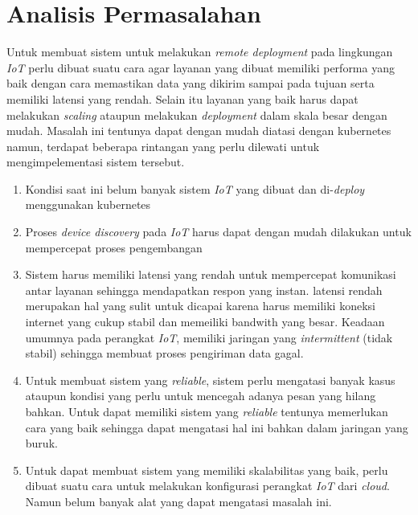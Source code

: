 \section{Analisis Permasalahan}
\label{sec:analisis-permasalahan}

Untuk membuat sistem untuk melakukan \textit{remote deployment} pada lingkungan \textit{IoT} perlu dibuat suatu cara agar layanan yang dibuat memiliki performa yang baik dengan cara memastikan data yang dikirim sampai pada tujuan serta memiliki latensi yang rendah. Selain itu layanan yang baik harus dapat melakukan \textit{scaling} ataupun melakukan \textit{deployment} dalam skala besar dengan mudah. Masalah ini tentunya dapat dengan mudah diatasi dengan kubernetes namun, terdapat beberapa rintangan yang perlu dilewati untuk mengimpelementasi sistem tersebut.

\begin{enumerate}
  \item Kondisi saat ini belum banyak sistem \textit{IoT} yang dibuat dan di-\textit{deploy} menggunakan kubernetes
  \item Proses \textit{device discovery} pada \textit{IoT} harus dapat dengan mudah dilakukan untuk mempercepat proses pengembangan
  \item Sistem harus memiliki latensi yang rendah untuk mempercepat komunikasi antar layanan sehingga mendapatkan respon yang instan. latensi rendah merupakan hal yang sulit untuk dicapai karena harus memiliki koneksi internet yang cukup stabil dan memeiliki bandwith yang besar. Keadaan umumnya pada perangkat \textit{IoT}, memiliki jaringan yang \textit{intermittent} (tidak stabil) sehingga membuat proses pengiriman data gagal.
  \item Untuk membuat sistem yang \textit{reliable}, sistem perlu mengatasi banyak kasus ataupun kondisi yang perlu untuk mencegah adanya pesan yang hilang bahkan. Untuk dapat memiliki sistem yang \textit{reliable} tentunya memerlukan cara yang baik sehingga dapat mengatasi hal ini bahkan dalam jaringan yang buruk.
  \item Untuk dapat membuat sistem yang memiliki skalabilitas yang baik, perlu dibuat suatu cara untuk melakukan konfigurasi perangkat \textit{IoT} dari \textit{cloud}. Namun belum banyak alat yang dapat mengatasi masalah ini.
\end{enumerate}
